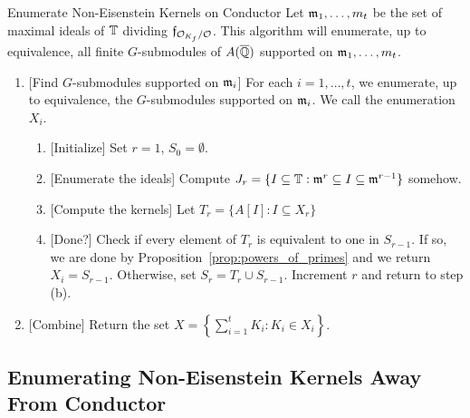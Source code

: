 \documentclass{article}
\begin{document}
\begin{algorithm}{Enumerate Non-Eisenstein Kernels on Conductor}%
    \label{alg:enumerate_non_eisenstein_on_conductor}
    Let $\mathfrak{m}_1,\ldots,m_t$ be the set of maximal ideals of $\mathbb{T}$ dividing
    $\mathfrak{f}_{\mathcal{O}_{K_f}/\mathcal{O}}$. This algorithm will enumerate, up to
    equivalence, all finite $G$-submodules of $A(\overline{\mathbb{Q}})$ supported on
    $\mathfrak{m}_1,\ldots,m_t$.
    \begin{enumerate}
        \item{} [Find $G$-submodules supported on $\mathfrak{m}_i$]
            For each $i=1,\ldots,t$, we enumerate, up to equivalence, the
            $G$-submodules supported on $\mathfrak{m}_i$. We call the enumeration $X_i$.
            \begin{enumerate}
                \item{} [Initialize]
                    Set $r=1$, $S_0=\emptyset$.
                \item{} [Enumerate the ideals]
                    Compute $J_r=\{I \subseteq \mathbb{T}: \mathfrak{m}^r \subseteq I \subseteq
                    \mathfrak{m}^{r-1}\}$ somehow. 
                \item{} [Compute the kernels]
                    Let $T_r=\{A[I]: I\subseteq X_r\}$
                \item{} [Done?]
                    Check if every element of $T_r$ is equivalent to one in
                    $S_{r-1}$. If so, we are done by
                    Proposition~\ref{prop:powers_of_primes} and we return
                    $X_i=S_{r-1}$. Otherwise, set $S_r=T_r\cup S_{r-1}$. Increment
                    $r$ and return to step (b).
            \end{enumerate}
        \item{} [Combine]
            Return the set $X= \left\{\sum_{i=1} ^t K_i:K_i\in X_i\right\}$.
    \end{enumerate}
\end{algorithm}

\subsection{Enumerating Non-Eisenstein Kernels Away From Conductor}%
\label{sub:enumerating_non_eisenstein_kernels_away_from_conductor}
\end{document}
